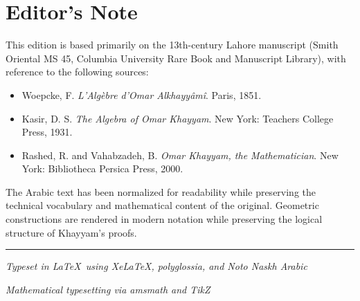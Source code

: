 \clearpage

\section*{Editor's Note}


This edition is based primarily on the 13th-century Lahore manuscript (Smith Oriental MS 45, Columbia University Rare Book and Manuscript Library), with reference to the following sources:

\begin{itemize}
[noitemsep]
\item Woepcke, F. 
\textit{L'Algèbre d'Omar Alkhayyâmî}. Paris, 1851.
\item Kasir, D. S. 
\textit{The Algebra of Omar Khayyam}. New York: Teachers College Press, 1931.
\item Rashed, R. and Vahabzadeh, B. 
\textit{Omar Khayyam, the Mathematician}. New York: Bibliotheca Persica Press, 2000.

\end{itemize}
The Arabic text has been normalized for readability while preserving the technical vocabulary and mathematical content of the original.
Geometric constructions are rendered in modern notation while preserving the logical structure of Khayyam's proofs.
\vspace{1cm}

\begin{center}
{
\color{rulecolor}
\rule{0.4\textwidth}{0.4pt}}

{\footnotesize
\textit{Typeset in \LaTeX\ using XeLaTeX, polyglossia, and Noto Naskh Arabic}}

{\footnotesize
\textit{Mathematical typesetting via amsmath and TikZ}}

\end{center}


